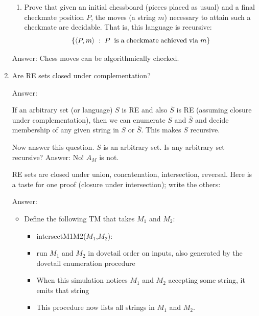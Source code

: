 \documentclass[10pt]{article}
\begin{document}
\begin{enumerate}
\begin{enumerate}
  \item Prove that given an initial chessboard (pieces placed
    as usual) and a final checkmate position $P$, the moves
    (a string $m$)
    necessary to attain such a checkmate are decidable.
    That is, this language is recursive:
    \[ \{ \langle P,m\rangle \;:\; P\; {\rm }
    \; {\rm is}
    \; {\rm a}
    \; {\rm checkmate}
    \; {\rm achieved}
    \; {\rm via}
    \; m
    \}
    \]
  \end{enumerate}
    \begin{sf}
      Answer: Chess moves can be algorithmically checked.
    \end{sf}
    
    
\item \label{qn:intersect}
  Are RE sets closed under complementation?
  \begin{sf}
    Answer:
    
    If an arbitrary set (or language) $S$
  is RE and also $\overline{S}$ is RE (assuming closure under
  complementation), then we can enumerate $S$
  and $\overline{S}$ and decide membership of any given string in
  $S$  or $\overline{S}$. This makes $S$ recursive.
  
  Now answer this question. $S$ is an arbitrary set. Is any
  arbitrary set recursive? {\sf Answer: No! $A_{M}$ is not.}

  RE sets are closed under union, concatenation, intersection, reversal.
  Here is a taste for one proof (closure under intersection); write the others:

  \begin{sf}
    Answer:
  \begin{itemize}
  \item Define the following TM that takes $M_1$ and $M_2$:
      \begin{itemize}
  \item intersectM1M2($M_1$,$M_2$):
  \item run $M_1$ and $M_2$ in dovetail order on inputs, also
    generated by the dovetail enumeration procedure
  \item When this simulation notices $M_1$ and $M_2$ accepting
    some string, it emits that string
  \item This procedure now lists all strings in $M_1$ and $M_2$.
      \end{itemize}
  \end{itemize}
  \end{sf}
  \end{sf}


\end{enumerate}
\end{document}
